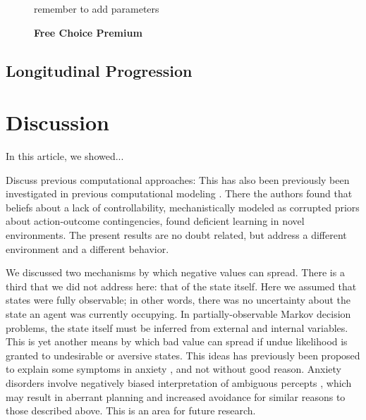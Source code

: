 \documentclass[11pt]{article} %
\begin{document}
\begin{figure}
  \centerline{%
  }
  \caption{\textbf{Free Choice Premium}}
  \par remember to add parameters
\end{figure}

\subsection{Longitudinal Progression}

\section{Discussion}

In this article, we showed...

Discuss previous computational approaches: This has also been previously been
investigated in previous computational modeling \cite{Huys2009}. There
the authors found that beliefs about a lack of controllability, mechanistically
modeled as corrupted priors about action-outcome contingencies, found deficient
learning in novel environments. The present results are no doubt related, but
address a different environment and a different behavior.

We discussed two mechanisms by which negative values can spread. There is a third
that we did not address here: that of the state itself. Here we assumed that states
were fully observable; in other words, there was no uncertainty about the state
an agent was currently occupying. In partially-observable Markov decision problems,
the state itself must be inferred from external and internal variables. This is
yet another means by which bad value can spread if undue likelihood is granted
to undesirable or aversive states. This ideas has previously been proposed to
explain some symptoms in anxiety \cite{Paulus2012}, and not without good reason.
Anxiety disorders involve negatively biased interpretation of ambiguous percepts
\cite{Hartley2012}, which may result in aberrant planning and increased avoidance
for similar reasons to those described above. This is an area for future research.
\end{document}
